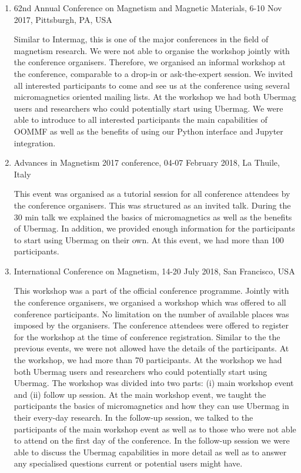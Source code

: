 \documentclass{deliverablereport}
\begin{document}
\begin{enumerate}
\item 62nd Annual Conference on Magnetism and Magnetic Materials, 6-10
Nov 2017, Pittsburgh, PA, USA

    Similar to Intermag, this is one of the major conferences in the
field of magnetism research. We were not able to organise the workshop
jointly with the conference organisers. Therefore, we organised an
informal workshop at the conference, comparable to a drop-in or
ask-the-expert session. We invited all
interested participants to come and see us at the conference using
several micromagnetics oriented mailing lists. At the workshop we had
both Ubermag users and researchers who could potentially start using
Ubermag. We were able to introduce to all interested participants the
main capabilities of OOMMF as well as the benefits of using our Python
interface and Jupyter integration.

\item Advances in Magnetism 2017 conference, 04-07 February 2018, La Thuile,
Italy

    This event was organised as a tutorial session for all conference
attendees by the conference organisers. This was structured as an
invited talk. During the 30 min talk we explained the basics of
micromagnetics as well as the benefits of Ubermag. In addition, we
provided enough information for the participants to start using
Ubermag on their own. At this event, we had more than 100
participants.

\item International Conference on Magnetism, 14-20 July 2018, San
Francisco, USA

    This workshop was a part of the official conference
programme. Jointly with the conference organisers, we organised a
workshop which was offered to all conference participants. No
limitation on the number of available places was imposed by the
organisers. The conference attendees were offered to register for the
workshop at the time of conference registration. Similar to the the
previous events, we were not allowed have the details of the
participants. At the workshop, we had more than 70 participants. At
the workshop we had both Ubermag users and researchers who could
potentially start using Ubermag. The workshop was divided into two
parts: (i) main workshop event and (ii) follow up session. At the main
workshop event, we taught the participants the basics of
micromagnetics and how they can use Ubermag in their every-day
research. In the follow-up session, we talked to the participants of
the main workshop event as well as to those who were not able to
attend on the first day of the conference. In the follow-up session we
were able to discuss the Ubermag capabilities in more detail as well
as to answer any specialised questions current or potential users
might have.


\end{enumerate}
\end{document}
